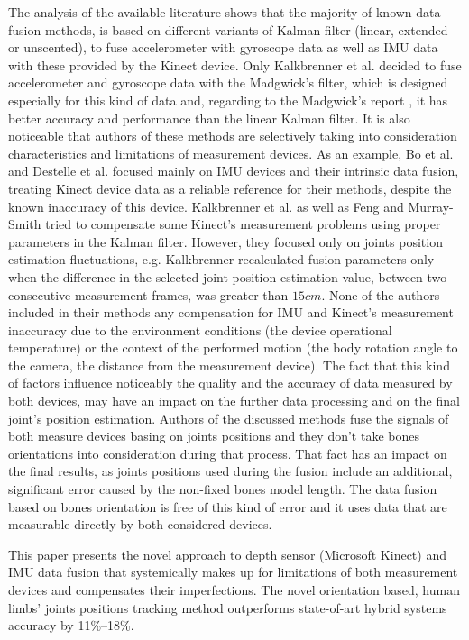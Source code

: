 \documentclass[sensors,article,submit,moreauthors,pdftex,10pt,a4paper]{mdpi}
\begin{document}
The analysis of the available literature shows that the majority of known data fusion methods, is based on different variants of Kalman filter (linear, extended or unscented), to fuse accelerometer with gyroscope data as well as IMU data with these provided by the Kinect device. Only Kalkbrenner et al. decided to fuse accelerometer and gyroscope data with the Madgwick's filter, which is designed especially for this kind of data and, regarding to the Madgwick's report \cite{Madgwick2011}, it has better accuracy and performance than the linear Kalman filter. It is also noticeable that authors of these methods are selectively taking into consideration characteristics and limitations of measurement devices. As an example, Bo et al. \cite{Bo2011a} and Destelle et al. \cite{Destelle2014} focused mainly on IMU devices and their intrinsic data fusion, treating Kinect device data as a reliable reference for their methods, despite the known inaccuracy of this device. Kalkbrenner et al.\cite{Kalkbrenner2014} as well as Feng and Murray-Smith\cite{Murray-Smith2014} tried to compensate some Kinect's measurement problems using proper parameters in the Kalman filter. However, they focused only on joints position estimation fluctuations, e.g. Kalkbrenner recalculated fusion parameters only when the difference in the selected joint position estimation value, between two consecutive measurement frames, was greater than $15cm$. None of the authors included in their methods any compensation for IMU and Kinect's measurement inaccuracy due to the environment conditions (the device operational temperature) or the context of the performed motion (the body rotation angle to the camera, the distance from the measurement device). The fact that this kind of factors influence noticeably the quality and the accuracy of data measured by both devices, may have an impact on the further data processing and on the final joint's position estimation. Authors of the discussed methods fuse the signals of both measure devices basing on joints positions and they don't take bones orientations into consideration during that process. That fact has an impact on the final results, as joints positions used during the fusion include an additional, significant error caused by the non-fixed bones model length. The data fusion based on bones orientation is free of this kind of error and it uses data that are measurable directly by both considered devices.

This paper presents the novel approach to depth sensor (Microsoft Kinect) and IMU data fusion that systemically makes up for limitations of both measurement devices and compensates their imperfections. The novel orientation based, human limbs’ joints positions tracking method outperforms state-of-art hybrid systems accuracy by 11\%--18\%.
\end{document}
